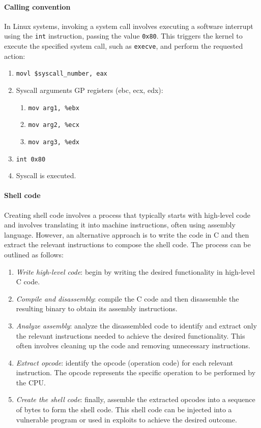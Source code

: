 \paragraph*{Calling convention}
In Linux systems, invoking a system call involves executing a software interrupt using the \texttt{int} instruction, passing the value \texttt{0x80}. 
This triggers the kernel to execute the specified system call, such as \texttt{execve}, and perform the requested action: 
\begin{enumerate}
    \item \texttt{movl \$syscall\_number, eax}
    \item Syscall arguments GP registers (ebc, ecx, edx): 
        \begin{enumerate}
            \item \texttt{mov arg1, \%ebx}
            \item \texttt{mov arg2, \%ecx}
            \item \texttt{mov arg3, \%edx}
        \end{enumerate}
    \item \texttt{int 0x80} 
    \item Syscall is executed.
\end{enumerate}

\paragraph*{Shell code}
Creating shell code involves a process that typically starts with high-level code and involves translating it into machine instructions, often using assembly language. However, an alternative approach is to write the code in C and then extract the relevant instructions to compose the shell code. The process can be outlined as follows:
\begin{enumerate}
    \item \textit{Write high-level code}: begin by writing the desired functionality in high-level C code.
    \item \textit{Compile and disassembly}: compile the C code and then disassemble the resulting binary to obtain its assembly instructions.
    \item \textit{Analyze assembly}: analyze the disassembled code to identify and extract only the relevant instructions needed to achieve the desired functionality. 
        This often involves cleaning up the code and removing unnecessary instructions.
    \item \textit{Extract opcode}: identify the opcode (operation code) for each relevant instruction. The opcode represents the specific operation to be performed by the CPU.
    \item \textit{Create the shell code}: finally, assemble the extracted opcodes into a sequence of bytes to form the shell code. 
        This shell code can be injected into a vulnerable program or used in exploits to achieve the desired outcome.
\end{enumerate}

